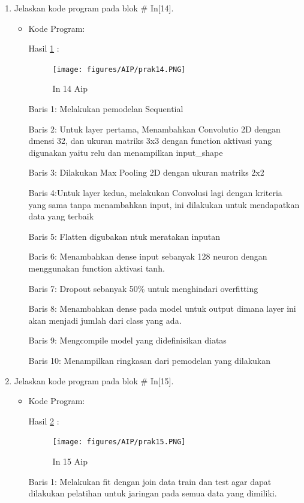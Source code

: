 \begin{enumerate}
\item Jelaskan kode program pada blok \# In[14].
\begin{itemize}
\item Kode Program:

\par Hasil \ref{in14aip} :
\begin{figure}[!hbtp]
\centering
\texttt{[image: figures/AIP/prak14.PNG]}
\caption{In 14 Aip}
\label{in14aip}
\end{figure}
\par Baris 1: Melakukan pemodelan Sequential
\par Baris 2: Untuk layer pertama, Menambahkan Convolutio 2D dengan dmensi 32, dan ukuran matriks 3x3 dengan function aktivasi yang digunakan yaitu relu dan menampilkan input\_shape
\par Baris 3: Dilakukan Max Pooling 2D dengan ukuran matriks 2x2
\par Baris 4:Untuk layer kedua, melakukan Convolusi lagi dengan kriteria yang sama tanpa menambahkan input, ini dilakukan untuk mendapatkan data yang terbaik
\par Baris 5:  Flatten digubakan ntuk meratakan inputan
\par Baris 6: Menambahkan dense input sebanyak 128 neuron dengan menggunakan function aktivasi tanh.
\par Baris 7: Dropout sebanyak 50\% untuk menghindari overfitting
\par Baris 8: Menambahkan dense pada model untuk output dimana layer ini akan menjadi jumlah dari class yang ada.
\par Baris 9: Mengcompile model yang didefinisikan diatas
\par Baris 10: Menampilkan ringkasan dari pemodelan yang dilakukan
\end{itemize}
\par

\item Jelaskan kode program pada blok \# In[15].
\begin{itemize}
\item Kode Program:

\par Hasil \ref{in15aip} :
\begin{figure}[!hbtp]
\centering
\texttt{[image: figures/AIP/prak15.PNG]}
\caption{In 15 Aip}
\label{in15aip}
\end{figure}
\par Baris 1: Melakukan fit dengan join data train dan test agar dapat dilakukan pelatihan untuk jaringan pada semua data yang dimiliki.
\end{itemize}
\par


\end{enumerate}
